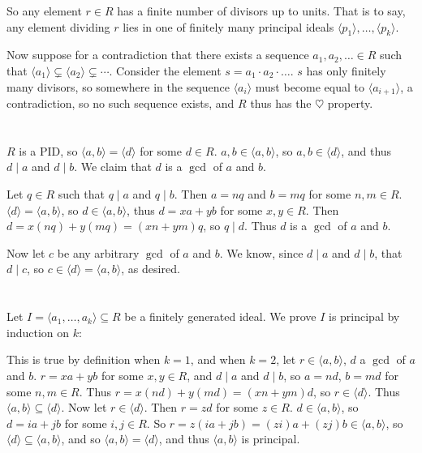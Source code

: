 \documentclass[11pt]{article}
\begin{document}
So any element $r\in R$ has a finite number of divisors up to units. That is
to say, any element dividing $r$ lies in one of finitely many principal ideals
$\langle p_1\rangle,\ldots,\langle p_k\rangle$.

Now suppose for a contradiction that there exists a sequence
$a_1,a_2,\ldots\in R$ such that $\langle a_1\rangle\subsetneq\langle
a_2\rangle\subsetneq\cdots$. Consider the element $s=a_1\cdot a_2\cdot\ldots$.
$s$ has only finitely many divisors, so somewhere in the sequence $\langle
a_i\rangle$ must become equal to $\langle a_{i+1}\rangle$, a contradiction, so
no such sequence exists, and $R$ thus has the $\heartsuit$ property.


\section{} %
$R$ is a PID, so $\langle a,b\rangle=\langle d\rangle$ for some $d\in R$.
$a,b\in\langle a,b\rangle$, so $a,b\in\langle d\rangle$, and thus $d\mid a$
and $d\mid b$. We claim that $d$ is a $\gcd$ of $a$ and $b$.

Let $q\in R$ such that $q\mid a$ and $q\mid b$. Then $a=nq$ and $b=mq$ for
some $n,m\in R$. $\langle d\rangle=\langle a,b\rangle$, so $d\in\langle
a,b\rangle$, thus $d=xa+yb$ for some $x,y\in R$. Then
$d=x(nq)+y(mq)=(xn+ym)q$, so $q\mid d$. Thus $d$ is a $\gcd$ of $a$ and $b$.

Now let $c$ be any arbitrary $\gcd$ of $a$ and $b$. We know, since $d\mid a$
and $d\mid b$, that $d\mid c$, so $c\in\langle d\rangle=\langle a,b\rangle$,
as desired.


\section{} %
\subsection{} %
Let $I=\langle a_1,\ldots,a_k\rangle\subseteq R$ be a finitely generated
ideal. We prove $I$ is principal by induction on $k$:

This is true by definition when $k=1$, and when $k=2$, let $r\in\langle
a,b\rangle$, $d$ a $\gcd$ of $a$ and $b$. $r=xa+yb$ for some $x,y\in R$, and
$d\mid a$ and $d\mid b$, so $a=nd$, $b=md$ for some $n,m\in R$. Thus
$r=x(nd)+y(md)=(xn+ym)d$, so $r\in\langle d\rangle$. Thus $\langle
a,b\rangle\subseteq\langle d\rangle$. Now let $r\in\langle d\rangle$. Then
$r=zd$ for some $z\in R$. $d\in\langle a,b\rangle$, so $d=ia+jb$ for some
$i,j\in R$. So $r=z(ia+jb)=(zi)a+(zj)b\in\langle a,b\rangle$, so
$\langle d\rangle\subseteq\langle a,b\rangle$, and so
$\langle a,b\rangle=\langle d\rangle$, and thus $\langle a,b\rangle$ is
principal.
\end{document}
